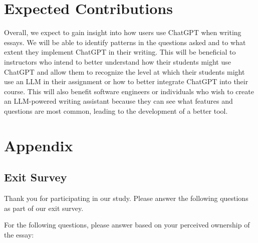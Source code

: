 \documentclass[sigconf]{acmart}
\begin{document}
\section{Expected Contributions}

    Overall, we expect to gain insight into how users use ChatGPT when writing essays. We will be able to identify patterns in the questions asked and to what extent they implement ChatGPT in their writing. This will be beneficial to instructors who intend to better understand how their students might use ChatGPT and allow them to recognize the level at which their students might use an LLM in their assignment or how to better integrate ChatGPT into their course. This will also benefit software engineers or individuals who wish to create an LLM-powered writing assistant because they can see what features and questions are most common, leading to the development of a better tool.





\appendix
\section{Appendix}
\subsection{Exit Survey}
    Thank you for participating in our study. Please answer the following questions as part of our exit survey.
    
    For the following questions, please answer based on your perceived ownership of the essay: 
    
\end{document}
